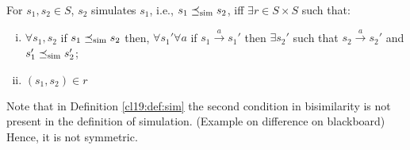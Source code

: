 

\begin{definition}[Simulation]
    \label{cl19:def:sim}
    For $s_1,s_2 \in S$, $s_2$ simulates $s_1$, i.e., $s_1 \preceq_{\mathrm{sim}} s_2$, iff $\exists r \in S \times S$ such that:
    \begin{enumerate}[(i),noitemsep]
        \item $\forall s_1,s_2$ if $s_1 \preceq_{\mathrm{sim}}  s_2$ then, $\forall s_1' \forall a$  if $s_1 \xrightarrow{a} s_1'$ then $\exists s_2'$ such that $s_2 \xrightarrow{a} s_2'$ and $s_1' \preceq_{\mathrm{sim}}  s_2'$;
        \item $(s_1,s_2) \in r$
    \end{enumerate}
\end{definition}

\begin{remark}
    Note that in Definition \ref{cl19:def:sim} the second condition in bisimilarity is not present in the definition of simulation. (Example on difference on blackboard)
    Hence, it is not symmetric.
\end{remark}

